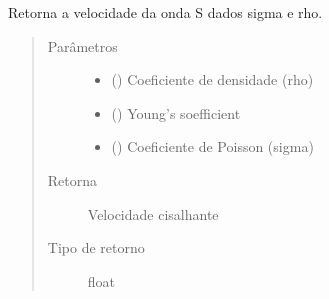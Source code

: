 \documentclass[letterpaper,10pt,brazil]{sphinxmanual}
\begin{document}
\begin{fulllineitems}
\label{\detokenize{source/base:base.velocity_s_by_young}}
Retorna a velocidade da onda S dados sigma e rho.
\begin{quote}\begin{description}
\item[{Parâmetros}] \leavevmode\begin{itemize}
\item {} 
 () \textendash{} Coeficiente de densidade (rho)

\item {} 
 () \textendash{} Young’s soefficient

\item {} 
 () \textendash{} Coeficiente de Poisson (sigma)

\end{itemize}

\item[{Retorna}] \leavevmode
Velocidade cisalhante

\item[{Tipo de retorno}] \leavevmode
float

\end{description}\end{quote}

\end{fulllineitems}

\end{document}
